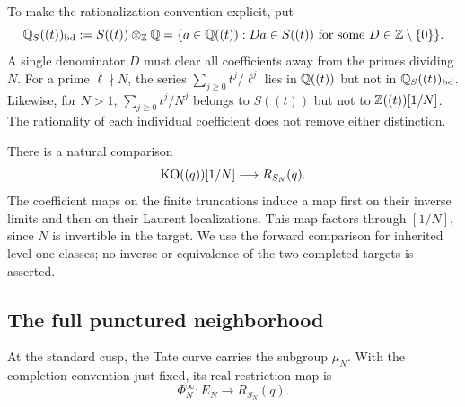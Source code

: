 To make the rationalization convention explicit, put
\begin{equation}\label{eq:bounded-numerator}
 \mathbb Q_S((t))_{\mathrm{bd}}:=S((t))\otimes_{\mathbb Z}\mathbb Q
 =\{a\in\mathbb Q((t)): Da\in S((t))\text{ for some }D\in\mathbb Z\setminus\{0\}\}.
\end{equation}
A single denominator $D$ must clear all coefficients away from the primes
dividing $N$. For a prime $\ell\nmid N$, the series
$\sum_{j\ge0}t^j/\ell^j$ lies in $\mathbb Q((t))$ but not in
$\mathbb Q_S((t))_{\mathrm{bd}}$. Likewise, for $N>1$, $\sum_{j\ge0}t^j/N^j$ belongs to
$S((t))$ but not to $\mathbb Z((t))[1/N]$. The rationality of each
individual coefficient does not remove either distinction.

There is a natural comparison
\begin{equation}\label{eq:old-new-comparison}
 \mathrm{KO}((q))[1/N]\longrightarrow R_{S_N}(q).
\end{equation}
The coefficient maps on the finite truncations induce a map first on
their inverse limits and then on their Laurent localizations. This map
factors through $[1/N]$, since $N$ is invertible in the target.
We use the forward comparison for inherited level-one classes; no
inverse or equivalence of the two completed targets is asserted.

\subsection{The full punctured neighborhood}
At the standard cusp, the Tate curve carries the subgroup $\mu_N$.
With the completion convention just fixed, its real restriction map is
\begin{equation}\label{eq:standard-map}
 \Phi_N^\infty:E_N\longrightarrow R_{S_N}(q).
\end{equation}

